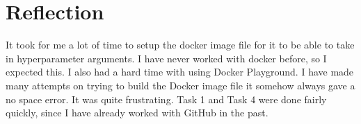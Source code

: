 \documentclass{article}
\begin{document}
\section{Reflection}
It took for me a lot of time to setup the docker image file for it to be able to take in hyperparameter arguments.
I have never worked with docker before, so I expected this. I also had a hard time with using Docker Playground. 
I have made many attempts on trying to build the Docker image file it somehow always gave a no space error. It was quite frustrating.
Task 1 and Task 4 were done fairly quickly, since I have already worked with GitHub in the past.
\end{document}
